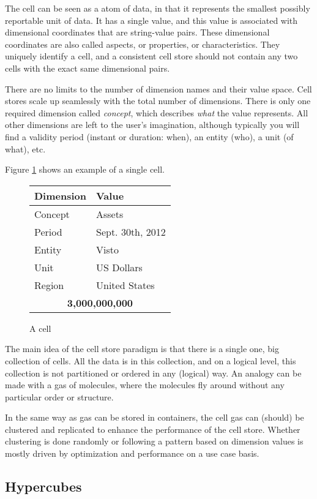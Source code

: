 \documentclass{acm_proc_article-sp}
\begin{document}
The cell can be seen as a atom of data, in that it represents the smallest possibly reportable unit of data. It has a single value, and this value is associated with dimensional coordinates that are string-value pairs. These dimensional coordinates are also called aspects, or properties, or characteristics. They uniquely identify a cell, and a consistent cell store should not contain any two cells with the exact same dimensional pairs.

There are no limits to the number of dimension names and their value space. Cell stores scale up seamlessly with the total number of dimensions. There is only one required dimension called \emph{concept}, which describes \emph{what} the value represents. All other dimensions are left to the user's imagination, although typically you will find a validity period (instant or duration: when), an entity (who), a unit (of what), etc.

Figure \ref{fig-cell} shows an example of a single cell.

\begin{figure}
\caption{A cell}
\label{fig-cell}
\begin{tabular}{|l|l|}
\hline
Dimension & Value \\
\hline
Concept & Assets \\
Period & Sept. 30th, 2012 \\
Entity & Visto \\
Unit & US Dollars \\
Region & United States \\
\hline
\multicolumn{2}{|c|}{\textbf{3,000,000,000}} \\
\hline
\end{tabular}
\end{figure}

The main idea of the cell store paradigm is that there is a single one, big collection of cells. All the data is in this collection, and on a logical level, this collection is not partitioned or ordered in any (logical) way. An analogy can be made with a gas of molecules, where the molecules fly around without any particular order or structure.

In the same way as gas can be stored in containers, the cell gas can (should) be clustered and replicated to enhance the performance of the cell store. Whether clustering is done randomly or following a pattern based on dimension values is mostly driven by optimization and performance on a use case basis.

\subsection{Hypercubes}
\end{document}

